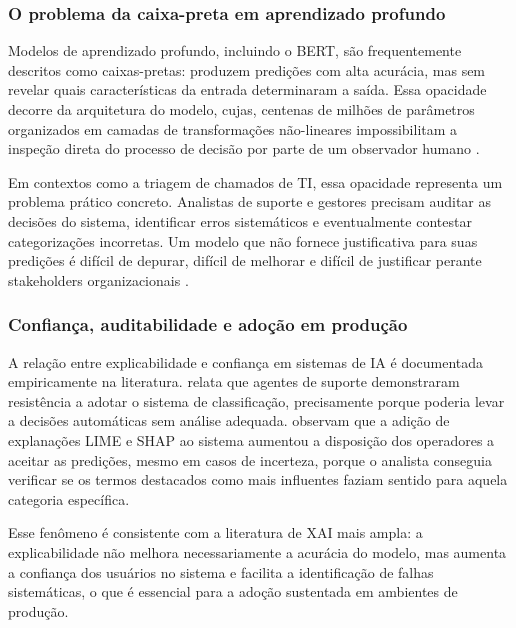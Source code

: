 \documentclass[
    12pt,                %
    openright,           %
    oneside,             %
    a4paper,             %
    english,             %
    brazil               %
]{abntex2}
\begin{document}
\subsubsection{O problema da caixa-preta em aprendizado profundo}
\label{subsubsec:xai_caixapreta}

Modelos de aprendizado profundo, incluindo o BERT, são frequentemente descritos como caixas-pretas: produzem predições com alta acurácia, mas sem revelar quais características da entrada determinaram a saída. Essa opacidade decorre da arquitetura do modelo, cujas, centenas de milhões de parâmetros organizados em camadas de transformações não-lineares impossibilitam a inspeção direta do processo de decisão por parte de um observador humano \cite{salih2023}.

Em contextos como a triagem de chamados de TI, essa opacidade representa um problema prático concreto. Analistas de suporte e gestores precisam auditar as decisões do sistema, identificar erros sistemáticos e eventualmente contestar categorizações incorretas. Um modelo que não fornece justificativa para suas predições é difícil de depurar, difícil de melhorar e difícil de justificar perante stakeholders organizacionais \cite{zemp2021}.

\subsubsection{Confiança, auditabilidade e adoção em produção}
\label{subsubsec:xai_confianca}

A relação entre explicabilidade e confiança em sistemas de IA é documentada empiricamente na literatura.  relata que agentes de suporte demonstraram resistência a adotar o sistema de classificação, precisamente porque poderia levar a decisões automáticas sem análise adequada.  observam que a adição de explanações LIME e SHAP ao sistema aumentou a disposição dos operadores a aceitar as predições, mesmo em casos de incerteza, porque o analista conseguia verificar se os termos destacados como mais influentes faziam sentido para aquela categoria específica.

Esse fenômeno é consistente com a literatura de XAI mais ampla: a explicabilidade não melhora necessariamente a acurácia do modelo, mas aumenta a confiança dos usuários no sistema e facilita a identificação de falhas sistemáticas, o que é essencial para a adoção sustentada em ambientes de produção.
\end{document}
